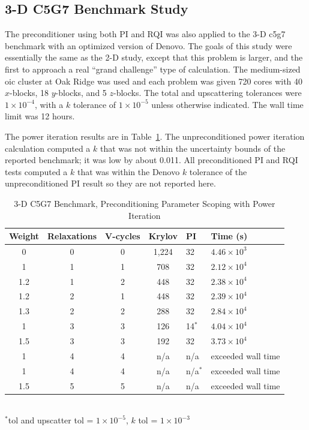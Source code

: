  \subsection{3-D C5G7 Benchmark Study}
The preconditioner using both PI and RQI was also applied to the 3-D c5g7 benchmark with an optimized version of Denovo. The goals of this study were essentially the same as the 2-D study, except that this problem is larger, and the first to approach a real ``grand challenge'' type of calculation. The medium-sized oic cluster at Oak Ridge was used and each problem was given 720 cores with 40 $x$-blocks, 18 $y$-blocks, and 5 $z$-blocks. The total and upscattering tolerances were $1 \times 10^{-4}$, with a $k$ tolerance of $1 \times 10^{-5}$ unless otherwise indicated. The wall time limit was 12 hours. 

The power iteration results are in Table~\ref{table:3-D c5g7}. The unpreconditioned power iteration calculation computed a $k$ that was not within the uncertainty bounds of the reported benchmark; it was low by about 0.011. All preconditioned PI and RQI tests computed a $k$ that was within the Denovo $k$ tolerance of the unpreconditioned PI result so they are not reported here. 
%
\begin{table}[!h]
\caption{3-D C5G7 Benchmark, Preconditioning Parameter Scoping with Power Iteration}
\begin{center}
\begin{tabular}{| c | c | c | c | l | l |}
\hline
Weight & Relaxations & V-cycles & Krylov & PI & Time (s) \\[0.5ex]
\hline
0    & 0 & 0 & 1,224 & 32 & $4.46 \times 10^{3}$ \\
1    & 1 & 1 & 708    & 32 & $2.12 \times 10^{4}$ \\
1.2 & 1 & 2 & 448    & 32 & $2.38 \times 10^{4}$ \\
1.2 & 2 & 1 & 448    & 32 & $2.39 \times 10^{4}$ \\
1.3 & 2 & 2 & 288    & 32 & $2.84 \times 10^{4}$ \\
1    & 3 & 3 & 126    & 14$^{*}$  & $4.04 \times 10^{4}$ \\
1.5 & 3 & 3 & 192    & 32 & $3.73 \times 10^{4}$ \\
1    & 4 & 4 & n/a     & n/a          & exceeded wall time \\
1    & 4 & 4 & n/a     & n/a$^{*}$ & exceeded wall time \\
1.5 & 5 & 5 & n/a     & n/a          & exceeded wall time \\
\hline 
\end{tabular}\\
$^{*}$tol and upscatter tol = $1 \times 10^{-5}$, $k$ tol = $1 \times 10^{-3}$
\end{center}
\label{table:3-D c5g7}
\end{table}

